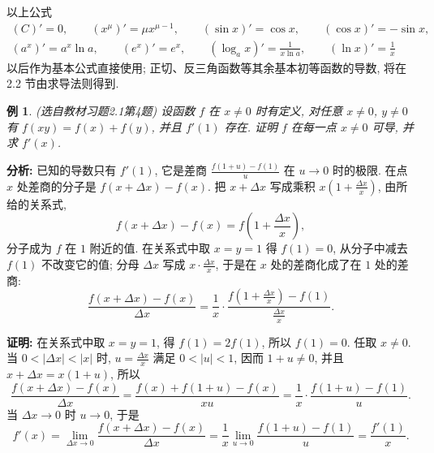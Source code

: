 \documentclass[UTF8,openany]{ctexbook}
\theoremstyle{chinesetextbook}
\newtheorem{example}{例}[section]
\newenvironment{cnproof}{\par\indent\textbf{证明:} \ignorespaces}{\par}
\begin{document}
以上公式
\[
\begin{gathered}
(C)'=0,\qquad(x^\mu)'=\mu x^{\mu-1},\qquad(\sin x)'=\cos x,\qquad(\cos x)'=-\sin x,\\
(a^x)'=a^x\ln a,\qquad(e^x)'=e^x,\qquad(\log_ax)'=\frac1{x\ln a},\qquad(\ln x)'=\frac1x
\end{gathered}
\]
以后作为基本公式直接使用; 正切、反三角函数等其余基本初等函数的导数, 将在 2.2 节由求导法则得到.
\begin{example}\label{ex:c2-h1-4}
\textnormal{(选自教材习题2.1第4题)} 设函数 $f$ 在 $x\ne0$ 时有定义, 对任意 $x\ne0$, $y\ne0$ 有 $f(xy)=f(x)+f(y)$, 并且 $f'(1)$ 存在. 证明 $f$ 在每一点 $x\ne0$ 可导, 并求 $f'(x)$.
\end{example}
\par\indent\textbf{分析:} 已知的导数只有 $f'(1)$, 它是差商 $\displaystyle\frac{f(1+u)-f(1)}u$ 在 $u\to0$ 时的极限. 在点 $x$ 处差商的分子是 $f(x+\Delta x)-f(x)$. 把 $x+\Delta x$ 写成乘积 $\displaystyle x\left(1+\frac{\Delta x}x\right)$, 由所给的关系式,
\[
f(x+\Delta x)-f(x)=f\left(1+\frac{\Delta x}x\right),
\]
分子成为 $f$ 在 $1$ 附近的值. 在关系式中取 $x=y=1$ 得 $f(1)=0$, 从分子中减去 $f(1)$ 不改变它的值; 分母 $\Delta x$ 写成 $\displaystyle x\cdot\frac{\Delta x}x$, 于是在 $x$ 处的差商化成了在 $1$ 处的差商:
\[
\frac{f(x+\Delta x)-f(x)}{\Delta x}=\frac1x\cdot\frac{f\left(1+\frac{\Delta x}x\right)-f(1)}{\frac{\Delta x}x}.
\]
\begin{cnproof}
在关系式中取 $x=y=1$, 得 $f(1)=2f(1)$, 所以 $f(1)=0$. 任取 $x\ne0$. 当 $0<|\Delta x|<|x|$ 时, $\displaystyle u=\frac{\Delta x}x$ 满足 $0<|u|<1$, 因而 $1+u\ne0$, 并且 $x+\Delta x=x(1+u)$, 所以
\[
\frac{f(x+\Delta x)-f(x)}{\Delta x}=\frac{f(x)+f(1+u)-f(x)}{xu}=\frac1x\cdot\frac{f(1+u)-f(1)}u.
\]
当 $\Delta x\to0$ 时 $u\to0$, 于是
\[
f'(x)=\lim_{\Delta x\to0}\frac{f(x+\Delta x)-f(x)}{\Delta x}=\frac1x\lim_{u\to0}\frac{f(1+u)-f(1)}u=\frac{f'(1)}x.
\]
\end{cnproof}
\end{document}
